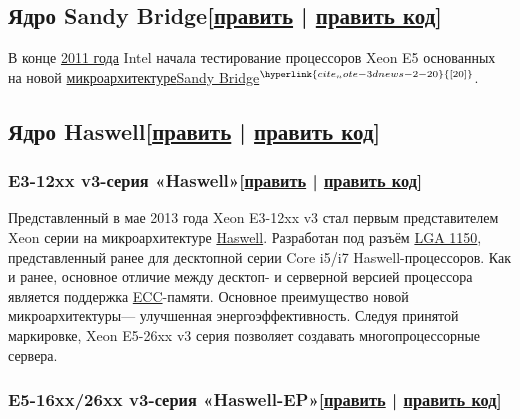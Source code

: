 \documentclass[a4paper,11pt]{article}
\begin{document}
\subsection{Ядро Sandy Bridge[\href{https://ru.wikipedia.org/w/index.php?title=Xeon&amp;veaction=edit&amp;section=7}{править} | \href{https://ru.wikipedia.org/w/index.php?title=Xeon&amp;action=edit&amp;section=7}{править код}]}

В конце \href{https://ru.wikipedia.org/wiki/2011_%D0%B3%D0%BE%D0%B4}{2011 года} Intel начала тестирование процессоров Xeon E5 основанных на новой \href{https://ru.wikipedia.org/wiki/%D0%9C%D0%B8%D0%BA%D1%80%D0%BE%D0%B0%D1%80%D1%85%D0%B8%D1%82%D0%B5%D0%BA%D1%82%D1%83%D1%80%D0%B0}{микроархитектуре}\href{https://ru.wikipedia.org/wiki/Sandy_Bridge}{Sandy Bridge}$^\hyperlink{cite_note-3dnews-2-20}{[20]}$.

\subsection{Ядро Haswell[\href{https://ru.wikipedia.org/w/index.php?title=Xeon&amp;veaction=edit&amp;section=8}{править} | \href{https://ru.wikipedia.org/w/index.php?title=Xeon&amp;action=edit&amp;section=8}{править код}]}

\subsubsection{E3-12xx v3-серия «Haswell»[\href{https://ru.wikipedia.org/w/index.php?title=Xeon&amp;veaction=edit&amp;section=9}{править} | \href{https://ru.wikipedia.org/w/index.php?title=Xeon&amp;action=edit&amp;section=9}{править код}]}

Представленный в мае 2013 года Xeon E3-12xx v3 стал первым представителем Xeon серии на микроархитектуре \href{https://ru.wikipedia.org/wiki/Haswell}{Haswell}. Разработан под разъём \href{https://ru.wikipedia.org/wiki/LGA_1150}{LGA 1150}, представленный ранее для десктопной серии Core i5/i7 Haswell-процессоров. Как и ранее, основное отличие между десктоп- и серверной версией процессора является поддержка \href{https://ru.wikipedia.org/wiki/ECC}{ECC}-памяти. Основное преимущество новой микроархитектуры\nolinebreak— улучшенная энергоэффективность. Следуя принятой маркировке, Xeon E5-26xx v3 серия позволяет создавать многопроцессорные сервера.

\subsubsection{E5-16xx/26xx v3-серия «Haswell-EP»[\href{https://ru.wikipedia.org/w/index.php?title=Xeon&amp;veaction=edit&amp;section=10}{править} | \href{https://ru.wikipedia.org/w/index.php?title=Xeon&amp;action=edit&amp;section=10}{править код}]}
\end{document}

